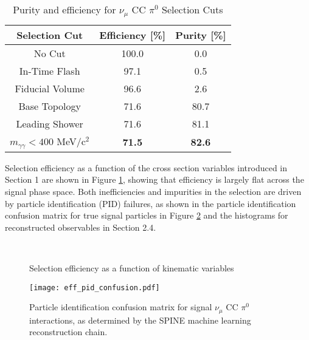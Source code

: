 \documentclass[../main.tex]{subfiles}
\begin{document}
\begin{table}[H]
    \caption{Purity and efficiency for $\nu_{\mu}$ CC $\pi^{0}$ Selection Cuts}
    \vspace{0.1cm}
    \centering
    \begin{tabular}{ c c c } 
    \hline
    Selection Cut & Efficiency [\%] & Purity [\%]  \\
    \hline
    No Cut & 100.0 & 0.0 \\ 
    In-Time Flash & 97.1 & 0.5 \\
    Fiducial Volume & 96.6 & 2.6 \\
    Base Topology & 71.6 & 80.7 \\
    Leading Shower & 71.6 & 81.1 \\
    $m_{\gamma \gamma} < 400$ MeV/c$^{2}$ & \textbf{71.5} & \textbf{82.6} \\
    \hline
    \end{tabular}
    \label{Tab:pureff}
\end{table}

Selection efficiency as a function of the cross section variables introduced in Section 1 are shown in Figure \ref{fig:sel_efficiency_plots}, showing that efficiency is largely flat across the signal phase space.  Both inefficiencies and impurities in the selection are driven by particle identification (PID) failures, as shown in the particle identification confusion matrix for true signal particles in Figure \ref{fig:eff_pid_confusion} and the histograms for reconstructed observables in Section 2.4.

\begin{figure}[H]
    \center
     \\
    \caption{Selection efficiency as a function of kinematic variables}
    \label{fig:sel_efficiency_plots}
\end{figure}

\begin{figure}[H]
    \center
    \texttt{[image: eff\_pid\_confusion.pdf]}
    \caption[text]{Particle identification confusion matrix for signal $\nu_{\mu}$ CC $\pi^{0}$ interactions, as determined by the SPINE machine learning reconstruction chain.}
    \label{fig:eff_pid_confusion}
\end{figure}
\end{document}
